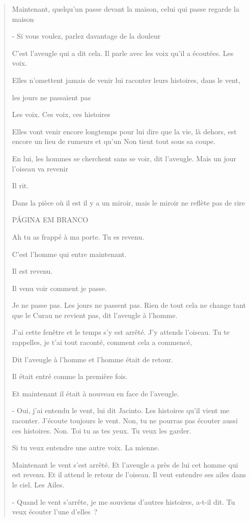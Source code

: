 \begin{quote}
Maintenant, quelqu'un passe devant la maison, celui qui passe regarde la
maison

- Si vous voulez, parlez davantage de la douleur

C'est l'aveugle qui a dit cela. Il parle avec les voix qu'il a écoutées.
Les voix.

Elles n'omettent jamais de venir lui raconter leurs histoires, dans le
vent,

les jours ne passaient pas

Les voix. Ces voix, ces histoires

Elles vont venir encore longtemps pour lui dire que la vie, là dehors,
est encore un lieu de rumeurs et qu'un Non tient tout sous sa coupe.

En lui, les hommes se cherchent sans se voir, dit l'aveugle. Mais un
jour l'oiseau va revenir

Il rit.

Dans la pièce où il est il y a un miroir, mais le miroir ne reflète pas
de rire

PÁGINA EM BRANCO

Ah tu as frappé à ma porte. Tu es revenu.

C'est l'homme qui entre maintenant.

Il est revenu.

Il venu voir comment je passe.

Je ne passe pas. Les jours ne passent pas. Rien de tout cela ne change
tant que le Curau ne revient pas, dit l'aveugle à l'homme.

J'ai cette fenêtre et le temps s'y est arrêté. J'y attends l'oiseau. Tu
te rappelles, je t'ai tout raconté, comment cela a commencé,

Dit l'aveugle à l'homme et l'homme était de retour.

Il était entré comme la première fois.

Et maintenant il était à nouveau en face de l'aveugle.

- Oui, j'ai entendu le vent, lui dit Jacinto. Les histoires qu'il vient
me raconter. J'écoute toujours le vent. Non, tu ne pourras pas écouter
aussi ces histoires. Non. Toi tu as tes yeux. Tu veux les garder.

Si tu veux entendre une autre voix. La mienne.

Maintenant le vent s'est arrêté. Et l'aveugle a près de lui cet homme
qui est revenu. Et il attend le retour de l'oiseau. Il veut entendre ses
ailes dans le ciel. Les Ailes.

- Quand le vent s'arrête, je me souviens d'autres histoires, a-t-il dit.
Tu veux écouter l'une d'elles~?


\end{quote}
